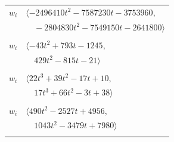 \documentclass[11pt]{article}
\begin{document}
\begin{longtable}{@{}ll@{}}
$w_i$ & $\langle -2496410t^{2}-7587230t-3753960,$\\
 & $\quad -2804830t^{2}-7549150t-2641800\rangle$\\
\addlinespace[2pt]
\multicolumn{2}{@{}p{0.97\textwidth}@{}}{$i=2$, $D_i=1$, $\rho_{ij}$: $6{:}2, \allowbreak 10{:}1, \allowbreak 21{:}1, \allowbreak 23{:}2, \allowbreak 26{:}2, \allowbreak 27{:}1, \allowbreak 38{:}1, \allowbreak 39{:}1, \allowbreak 40{:}2, \allowbreak 47{:}2, \allowbreak 57{:}1, \allowbreak 59{:}1, \allowbreak 60{:}2, \allowbreak 61{:}1, \allowbreak 65{:}1, \allowbreak 69{:}2, \allowbreak 75{:}2, \allowbreak 77{:}1, \allowbreak 84{:}2, \allowbreak 89{:}1, \allowbreak 93{:}2, \allowbreak 95{:}2$}\\
$w_i$ & $\langle -43t^{2}+793t-1245,$\\
 & $\quad 429t^{2}-815t-21\rangle$\\
\addlinespace[2pt]
\multicolumn{2}{@{}p{0.97\textwidth}@{}}{$i=3$, $D_i=1$, $\rho_{ij}$: $8{:}2, \allowbreak 18{:}1, \allowbreak 19{:}2, \allowbreak 20{:}2, \allowbreak 23{:}2, \allowbreak 29{:}2, \allowbreak 36{:}1, \allowbreak 37{:}2, \allowbreak 57{:}1, \allowbreak 67{:}1, \allowbreak 74{:}1, \allowbreak 77{:}1, \allowbreak 81{:}1, \allowbreak 93{:}2$}\\
$w_i$ & $\langle 22t^{3}+39t^{2}-17t+10,$\\
 & $\quad 17t^{3}+66t^{2}-3t+38\rangle$\\
\addlinespace[2pt]
\multicolumn{2}{@{}p{0.97\textwidth}@{}}{$i=4$, $D_i=1$, $\rho_{ij}$: $26{:}1, \allowbreak 27{:}2, \allowbreak 30{:}2, \allowbreak 31{:}1, \allowbreak 39{:}1, \allowbreak 40{:}2, \allowbreak 43{:}1, \allowbreak 45{:}2, \allowbreak 47{:}1, \allowbreak 59{:}2, \allowbreak 85{:}2, \allowbreak 87{:}1, \allowbreak 89{:}2, \allowbreak 95{:}1$}\\
$w_i$ & $\langle 490t^{2}-2527t+4956,$\\
 & $\quad 1043t^{2}-3479t+7980\rangle$\\
\addlinespace[2pt]
\multicolumn{2}{@{}p{0.97\textwidth}@{}}{$i=5$, $D_i=2$, $\rho_{ij}$: $6{:}2, \allowbreak 9{:}1, \allowbreak 10{:}2, \allowbreak 22{:}1, \allowbreak 23{:}1, \allowbreak 25{:}1, \allowbreak 26{:}1, \allowbreak 27{:}2, \allowbreak 36{:}2, \allowbreak 37{:}1, \allowbreak 41{:}1, \allowbreak 42{:}2, \allowbreak 43{:}1, \allowbreak 45{:}2, \allowbreak 57{:}2, \allowbreak 64{:}2, \allowbreak 65{:}1, \allowbreak 68{:}2, \allowbreak 69{:}1, \allowbreak 76{:}2, \allowbreak 77{:}2, \allowbreak 79{:}2, \allowbreak 85{:}2, \allowbreak 87{:}1, \allowbreak 93{:}1, \allowbreak 97{:}1$}\\

\end{longtable}
\end{document}
